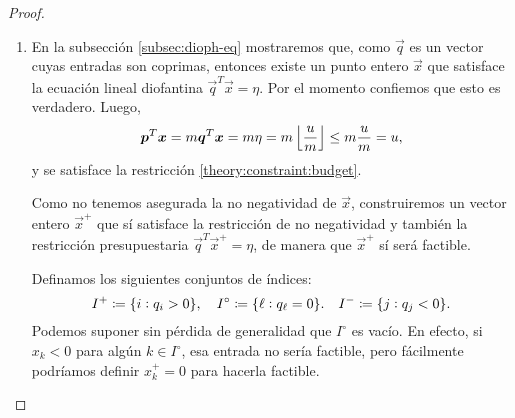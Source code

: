 \begin{proof} \hfill
	\begin{enumerate}
		\item
			En la subsección \ref{subsec:dioph-eq} mostraremos que, como $\vec{q}$ es un vector
			cuyas entradas son coprimas, entonces existe un punto entero $\vec{x}$ que satisface la
			ecuación lineal diofantina $\vec{q}^T\vec{x} = \eta$. Por el momento confiemos que esto
			es verdadero. Luego,
			\begin{equation*}
				\boldsymbol{p}^T\boldsymbol{x} = m\boldsymbol{q}^T\boldsymbol{x} = m\eta = m\left\lfloor \frac{u}{m} \right\rfloor \leq
				m\frac{u}{m} = u,
			\end{equation*}
			y se satisface la restricción \eqref{theory:constraint:budget}.

			Como no tenemos asegurada la no negatividad de $\vec{x}$, construiremos un vector entero
			$\vec{x}^+$ que sí satisface la restricción de no negatividad y también la restricción
			presupuestaria $\vec{q}^T\vec{x}^+ = \eta$, de manera que $\vec{x}^+$ sí será factible.

			Definamos los siguientes conjuntos de índices:
			\begin{equation*}
				I^+ \coloneq \lbrace i \vcentcolon q_i > 0 \rbrace,
				\quad I^\circ \coloneq \lbrace \ell \vcentcolon q_\ell = 0 \rbrace.
				\quad I^- \coloneq \lbrace j \vcentcolon q_j < 0 \rbrace.
			\end{equation*}
			Podemos suponer sin pérdida de generalidad que $I^\circ$ es vacío. En efecto, si $x_k
			< 0$ para algún $k \in I^\circ$, esa entrada no sería factible, pero fácilmente
			podríamos definir $x_k^+ = 0$ para hacerla factible.


\end{enumerate}
\end{proof}
